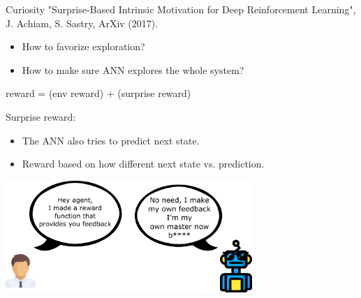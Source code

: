 \documentclass{beamer}
\begin{document}
\begin{frame}{Curiosity}
"Surprise-Based Intrinsic Motivation for Deep Reinforcement Learning", J. Achiam, S. Sastry, ArXiv (2017).

    \begin{itemize}
        \item How to favorize exploration?
        \item How to make sure ANN explores the whole system?
    \end{itemize}

    \begin{center}
        reward = (env reward) + (surprise reward)
    \end{center}

    Surprise reward:
\begin{itemize}
    \item The ANN also tries to predict next state.
    \item Reward based on how different next state vs. prediction.
\end{itemize}

    \begin{center}
    \includegraphics[width=0.70\textwidth]{Figures/curiosity}
    \end{center}

\end{frame}
\end{document}
